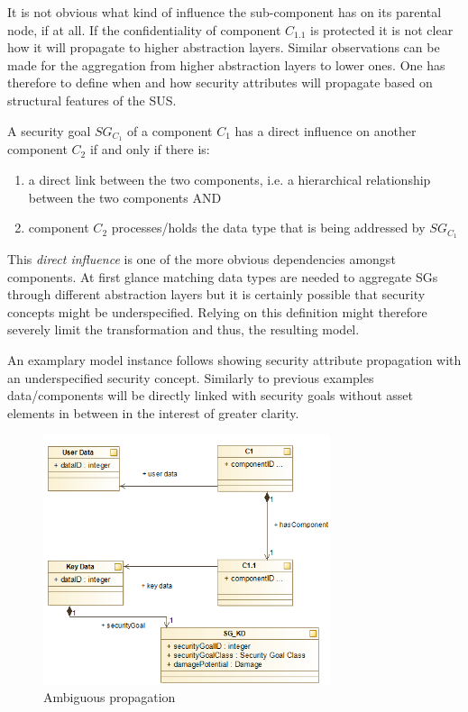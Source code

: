 It is not obvious what kind of influence the sub-component has on its parental node, if at all. If the confidentiality of component $C_{1.1}$ is protected it is not clear how it will propagate to higher abstraction layers. Similar observations can be made for the aggregation from higher abstraction layers to lower ones. One has therefore to define when and how security attributes will propagate based on structural features of the SUS.

\begin{theorem}
A security goal $SG_{C_1}$ of a component $C_1$ has a direct influence on another component $C_2$ if and only if there is: 
\begin{enumerate}
\item a direct link between the two components, i.e. a hierarchical relationship between the two components AND
\item component $C_2$ processes/holds the data type that is being addressed by $SG_{C_1}$
\end{enumerate} 
\end{theorem}

This \textit{direct influence} is one of the more obvious dependencies amongst components. At first glance matching data types are needed to aggregate SGs through different abstraction layers but it is certainly possible that security concepts might be underspecified. Relying on this definition might therefore severely limit the transformation and thus, the resulting model.

An examplary model instance follows showing security attribute propagation with an underspecified security concept. Similarly to previous examples data/components will be directly linked with security goals without asset elements in between in the interest of greater clarity.

\begin{figure}[H]
\centering
\includegraphics[width=0.75\textwidth]{pictures/sg_deduction.png}
\caption{Ambiguous propagation}
\label{fig:subcomponent_dilemma}
\end{figure} 

